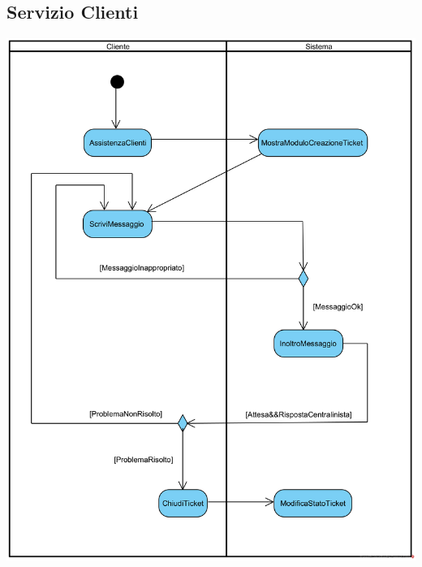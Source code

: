 \documentclass[12pt,a4paper]{article}
\begin{document}
\subsection{Servizio Clienti}
\begin{center}
\includegraphics[width=\textwidth]{ActivityDiagram/ClienteCreazioneTicket}
\end{center}
\end{document}
